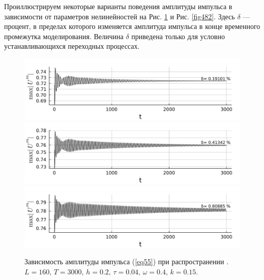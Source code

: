 \documentclass[14pt,a4paper]{extreport}
\begin{document}
			Проиллюстрируем некоторые варианты поведения амплитуды импульса в зависимости от параметров нелинейностей на Рис. \ref{fig481} и Рис. \ref{fig482}. Здесь \(\delta\) — процент, в пределах которого изменяется амплитуда импульса в конце временного промежутка моделирования. Величина \(\delta\) приведена только для условно устанавливающихся переходных процессах.
			\begin{figure}[H] %
				\begin{minipage}[h]{1\linewidth}
					\includegraphics[width=1\linewidth]{fig35.png}
					\label{fig48_1}
					\includegraphics[width=1\linewidth]{fig36.png}
					\label{fig48_2}
					\includegraphics[width=1\linewidth]{fig84.png}
					\label{fig48_3}
				\end{minipage}
				\caption{Зависимость амплитуды импульса (\ref{eq55}) при распространении .
				\(L=160,\, T=3000,\, h=0.2,\, \tau=0.04,\, \omega=0.4,\, k=0.15\).}
				\label{fig481}
			\end{figure}
\end{document}
